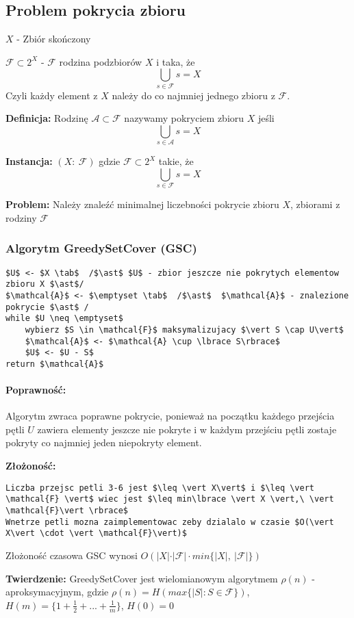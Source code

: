 \subsection{Problem pokrycia zbioru}
$X$ - Zbiór skończony

$\mathcal{F} \subset 2^{X}$ - $\mathcal{F}$ rodzina podzbiorów $X$ i taka, że $$\bigcup_{s\in \mathcal{F}}s = X$$ 
Czyli każdy element z $X$ należy do co najmniej jednego zbioru z $\mathcal{F}$.

\textbf{Definicja: }Rodzinę $\mathcal{A}\subset \mathcal{F}$ nazywamy pokryciem zbioru $X$ jeśli $$\bigcup_{s\in \mathcal{A}}s = X$$

\textbf{Instancja: }$(X:\ \mathcal{F})$ gdzie $\mathcal{F} \subset 2^{X}$ takie, że $$\bigcup_{s\in \mathcal{F}}s = X$$

\textbf{Problem: }Należy znaleźć minimalnej liczebności pokrycie zbioru $X$, zbiorami z rodziny $\mathcal{F}$

\subsubsection{Algorytm GreedySetCover (GSC)}
\begin{lstlisting}[caption={GreedySetCover(X,F)}]
$U$ <- $X \tab$  /$\ast$ $U$ - zbior jeszcze nie pokrytych elementow zbioru X $\ast$/
$\mathcal{A}$ <- $\emptyset \tab$  /$\ast$  $\mathcal{A}$ - znalezione pokrycie $\ast$ /
while $U \neq \emptyset$
	wybierz $S \in \mathcal{F}$ maksymalizujacy $\vert S \cap U\vert$
	$\mathcal{A}$ <- $\mathcal{A} \cup \lbrace S\rbrace$
	$U$ <- $U - S$
return $\mathcal{A}$
\end{lstlisting}

\paragraph{Poprawność: }
Algorytm zwraca poprawne pokrycie, ponieważ na początku każdego przejścia pętli $U$ zawiera elementy jeszcze nie pokryte i w każdym przejściu pętli zostaje pokryty co najmniej jeden niepokryty element.

\textbf{Złożoność: }
\begin{lstlisting}
Liczba przejsc petli 3-6 jest $\leq \vert X\vert$ i $\leq \vert \mathcal{F} \vert$ wiec jest $\leq min\lbrace \vert X \vert,\ \vert \mathcal{F}\vert \rbrace$
Wnetrze petli mozna zaimplementowac zeby dzialalo w czasie $O(\vert X\vert \cdot \vert \mathcal{F}\vert)$
\end{lstlisting}
\begin{center}
Złożoność czasowa GSC wynosi $O(\vert X\vert \cdot \vert\mathcal{F}\vert \cdot min\lbrace \vert X \vert,\ \vert \mathcal{F}\vert \rbrace)$
\end{center}
\textbf{Twierdzenie: }GreedySetCover jest wielomianowym algorytmem $\rho(n)$ - aproksymacyjnym, gdzie $\rho(n) = H(max\lbrace\vert S\vert :S\in \mathcal{F}\rbrace)$, $H(m) = \lbrace 1 + \frac{1}{2} + ... +\frac{1}{m}\rbrace$, $H(0)=0$

